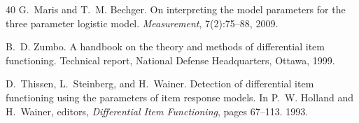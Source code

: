 \documentclass[11pt,a4paper]{article}
\begin{document}
\begin{thebibliography}{40}
G.~Maris and T.~M. Bechger.
\newblock On interpreting the model parameters for the three parameter logistic model.
\newblock \emph{Measurement}, 7(2):75--88, 2009.

B.~D. Zumbo.
\newblock A handbook on the theory and methods of differential item functioning.
\newblock Technical report, National Defense Headquarters, Ottawa, 1999.

D.~Thissen, L.~Steinberg, and H.~Wainer.
\newblock Detection of differential item functioning using the parameters of item response models.
\newblock In P.~W. Holland and H.~Wainer, editors, \emph{Differential Item Functioning}, pages 67--113. 1993.

\end{thebibliography}
\end{document}
